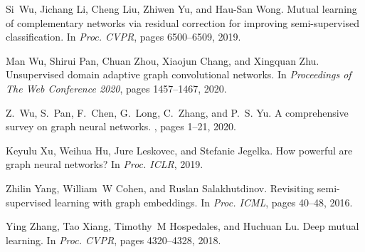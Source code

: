 \documentclass{article}
\begin{document}
\begin{thebibliography}{}
Si~Wu, Jichang Li, Cheng Liu, Zhiwen Yu, and Hau-San Wong.
\newblock Mutual learning of complementary networks via residual correction for
  improving semi-supervised classification.
\newblock In {\em Proc. CVPR}, pages 6500--6509, 2019.

Man Wu, Shirui Pan, Chuan Zhou, Xiaojun Chang, and Xingquan Zhu.
\newblock Unsupervised domain adaptive graph convolutional networks.
\newblock In {\em Proceedings of The Web Conference 2020}, pages 1457--1467,
  2020.

Z.~{Wu}, S.~{Pan}, F.~{Chen}, G.~{Long}, C.~{Zhang}, and P.~S. {Yu}.
\newblock A comprehensive survey on graph neural networks.
,
  pages 1--21, 2020.

Keyulu Xu, Weihua Hu, Jure Leskovec, and Stefanie Jegelka.
\newblock How powerful are graph neural networks?
\newblock In {\em Proc. ICLR}, 2019.

Zhilin Yang, William~W Cohen, and Ruslan Salakhutdinov.
\newblock Revisiting semi-supervised learning with graph embeddings.
\newblock In {\em Proc. ICML}, pages 40--48, 2016.

Ying Zhang, Tao Xiang, Timothy~M Hospedales, and Huchuan Lu.
\newblock Deep mutual learning.
\newblock In {\em Proc. CVPR}, pages 4320--4328, 2018.

\end{thebibliography}
\end{document}
